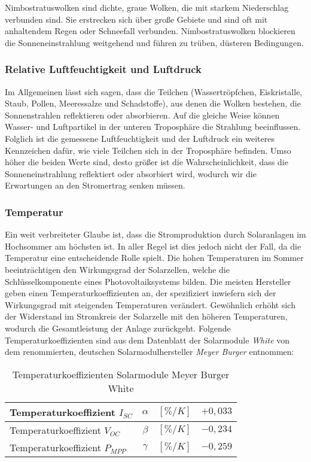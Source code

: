 \documentclass[12pt, a4paper]{article}
\begin{document}
Nimbostratuswolken sind dichte, graue Wolken, die mit starkem Niederschlag verbunden sind. Sie erstrecken sich über große Gebiete und sind oft mit anhaltendem Regen oder Schneefall verbunden. Nimbostratuswolken blockieren die Sonneneinstrahlung weitgehend und führen zu trüben, düsteren Bedingungen.

\subsubsection{Relative Luftfeuchtigkeit und Luftdruck}

Im Allgemeinen lässt sich sagen, dass die Teilchen (Wassertröpfchen, Eiskristalle, Staub, Pollen, Meeressalze und Schadstoffe), aus denen die Wolken bestehen, die Sonnenstrahlen reflektieren oder absorbieren. Auf die gleiche Weise können Wasser- und Luftpartikel in der unteren Troposphäre die Strahlung beeinflussen. Folglich ist die gemessene Luftfeuchtigkeit und der Luftdruck ein weiteres Kennzeichen dafür, wie viele Teilchen sich in der Troposphäre befinden. Umso höher die beiden Werte sind, desto größer ist die Wahrscheinlichkeit, dass die Sonneneinstrahlung reflektiert oder absorbiert wird, wodurch wir die Erwartungen an den Stromertrag senken müssen. 

\subsubsection{Temperatur}

Ein weit verbreiteter Glaube ist, dass die Stromproduktion durch Solaranlagen im Hochsommer am höchsten ist. In aller Regel ist dies jedoch nicht der Fall, da die Temperatur eine entscheidende Rolle spielt. Die hohen Temperaturen im Sommer beeinträchtigen den Wirkungsgrad der Solarzellen, welche die Schlüsselkomponente eines Photovoltaiksystems bilden. Die meisten Hersteller geben einen Temperaturkoeffizienten an, der spezifiziert inwiefern sich der Wirkungsgrad mit steigenden Temperaturen verändert. Gewöhnlich erhöht sich der Widerstand im Stromkreis der Solarzelle mit den höheren Temperaturen, wodurch die Gesamtleistung der Anlage zurückgeht. Folgende Temperaturkoeffizienten sind aus dem Datenblatt der Solarmodule \textit{White} von dem renommierten, deutschen Solarmodulhersteller \textit{Meyer Burger} entnommen: \newline


\begin{table}[h]
\begin{center}
\def\arraystretch{1.5}
\setlength\tabcolsep{0.75cm}
\begin{tabular}{| l | c | r | c |}
\hline
Temperaturkoeffizient $I_{SC}$ &	$\alpha$ & 	$[\%/K]$ &		$+0,033$ \\ \hline
Temperaturkoeffizient $V_{OC}$ & 	$\beta$  &	$[\%/K]$ & 		$-0,234$ \\ \hline
Temperaturkoeffizient $P_{MPP}$ & 	$\gamma$  &	$[\%/K]$ & 		$-0,259$ \\ \hline
\end{tabular}
\end{center}
\caption{Temperaturkoeffizienten Solarmodule Meyer Burger White}
\label{tab:temperaturkoeffizienten} 
\end{table}
\end{document}
